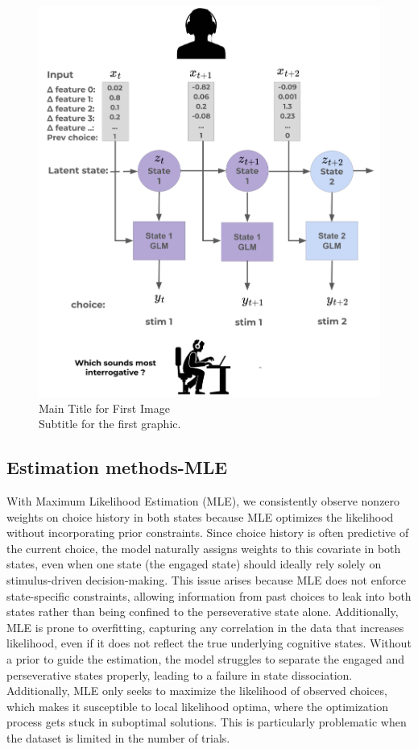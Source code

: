 \begin{figure}[H]
    \centering
    \includegraphics[width=12cm]{MainLayout/Images/chapter7/experiment_model.png}
    \caption{Main Title for First Image \\ \small Subtitle for the first graphic.}
    \label{fig:patient_responses}
\end{figure}


\subsection {Estimation methods-MLE} 
With Maximum Likelihood Estimation (MLE), we consistently observe nonzero weights on choice history in both states because MLE optimizes the likelihood without incorporating prior constraints. Since choice history is often predictive of the current choice, the model naturally assigns weights to this covariate in both states, even when one state (the engaged state) should ideally rely solely on stimulus-driven decision-making. This issue arises because MLE does not enforce state-specific constraints, allowing information from past choices to leak into both states rather than being confined to the perseverative state alone. Additionally, MLE is prone to overfitting, capturing any correlation in the data that increases likelihood, even if it does not reflect the true underlying cognitive states. Without a prior to guide the estimation, the model struggles to separate the engaged and perseverative states properly, leading to a failure in state dissociation. Additionally, MLE only seeks to maximize the likelihood of observed choices, which makes it susceptible to local likelihood optima, where the optimization process gets stuck in suboptimal solutions. This is particularly problematic when the dataset is limited in the number of trials.

